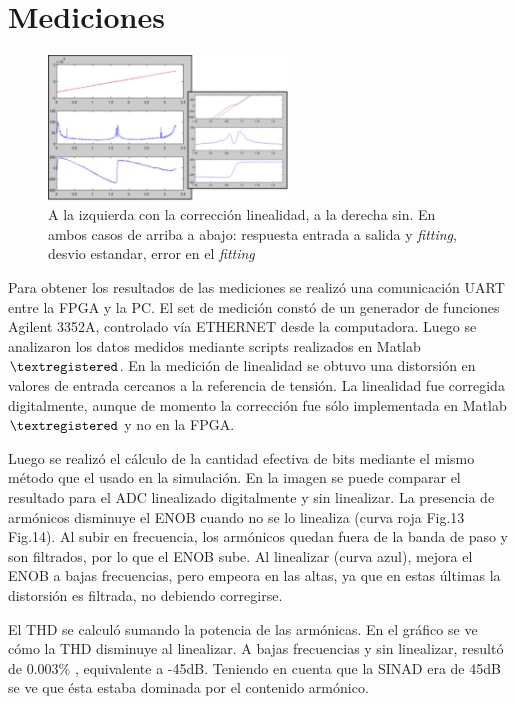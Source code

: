 \documentclass[a4paper,conference]{IEEEtran}
\begin{document}
\section{Mediciones}

\begin{figure}[!t]
\centering
\includegraphics[width=2.5in]{Medicion_Linealidad}
\caption{A la izquierda con la correcci\'on linealidad, a la derecha sin. En ambos casos de arriba a abajo: respuesta entrada a salida y \textit{fitting}, desvio estandar, error en el \textit{fitting}}
\label{fig_12}
\end{figure}

Para obtener los resultados de las mediciones se realiz\'o una comunicaci\'on UART entre la FPGA y la PC. El set de medici\'on const\'o de un generador de funciones Agilent 3352A, controlado v\'ia ETHERNET desde la computadora. Luego se analizaron los datos medidos mediante scripts realizados en Matlab$\textregistered$.
En la medici\'on de linealidad se obtuvo una distorsi\'on en valores de entrada cercanos a la referencia de tensi\'on. La linealidad fue corregida digitalmente, aunque de momento la corrección fue s\'olo implementada en Matlab$\textregistered$ y no en la FPGA.
 
Luego se realiz\'o el c\'alculo de la cantidad efectiva de bits mediante el mismo m\'etodo que el usado en la simulaci\'on. En la imagen se puede comparar el resultado para el ADC linealizado digitalmente y sin linealizar.
La presencia de arm\'onicos disminuye el ENOB cuando no se lo linealiza (curva roja Fig.13 Fig.14). Al subir en frecuencia, los arm\'onicos quedan fuera de la banda de paso y son filtrados, por lo que el ENOB sube. Al linealizar (curva azul), mejora el ENOB a bajas frecuencias, pero empeora en las altas, ya que en estas últimas la distorsión es filtrada, no debiendo corregirse.

El THD se calcul\'o sumando la potencia de las arm\'onicas. En el gr\'afico se ve c\'omo la THD disminuye al linealizar. A bajas frecuencias y sin linealizar, result\'o de 0.003$\%$ , equivalente a -45dB. Teniendo en cuenta que la SINAD era de 45dB se ve que \'esta estaba dominada por el contenido arm\'onico.
\end{document}
